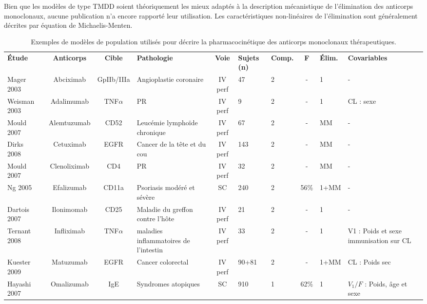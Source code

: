 Bien que les modèles de type TMDD soient théoriquement les mieux adaptés à la description mécanistique de l'élimination des anticorps monoclonaux, aucune publication n'a encore rapporté leur utilisation. Les caractéristiques non-linéaires de l'élimination sont généralement décrites par équation de Michaelis-Menten.  

\begin{table}[!ht]
\begin{tiny}
  \centering
  \caption{Exemples de modèles de population utilisés pour décrire la pharmacocinétique des anticorps monoclonaux thérapeutiques.}
    \begin{tabular}{p{1.1cm}ccp{1.7cm}cp{.9cm}p{.8cm}cp{.7cm}p{2.1cm}}
      &&&&&&&&& \\
      \hline
\textbf{Étude} & \textbf{Anticorps} & \textbf{Cible} & \textbf{Pathologie} & \textbf{Voie} & \textbf{Sujets (n)} & \textbf{Comp.} & \textbf{F} & \textbf{Élim.} & \textbf{Covariables} \\
      \hline
      \hline
      Mager 2003~\citep{REF65} & Abciximab & GpIIb/IIIa & Angioplastie coronaire & \gls{IV} perf & 47 & 2 & - & 1 & - \\
      Weisman 2003~\citep{REF66} & Adalimumab & TNF$\alpha$ & PR & \gls{IV} perf & 9 & 2 & - & 1 & \gls{CL} : sexe \\
      Mould 2007~\citep{REF67} & Alemtuzumab & CD52 & Leucémie lymphoïde chronique & \gls{IV} perf & 67 & 2 & - & MM & - \\
      Dirks 2008~\citep{REF68} & Cetuximab & EGFR & Cancer de la tête et du cou & \gls{IV} perf & 143 & 2 & - & MM & - \\
      Mould 2007~\citep{REF69} & Clenoliximab & CD4 & PR & \gls{IV} perf & 32 & 2 & - & MM & - \\
      Ng 2005~\citep{REF50} & Efalizumab & CD11a & Psoriasis modéré et sévère & SC & 240 & 2 & 56\% & 1+MM & - \\
      Dartois 2007~\citep{REF70} & Ilonimomab & CD25 & Maladie du greffon contre l'hôte & \gls{IV} perf & 21 & 2 & - & 1 & - \\
      Ternant 2008~\citep{REF71} & Infliximab & TNF$\alpha$ & maladies inflammatoires de l'intestin & \gls{IV} perf & 33 & 2 & - & 1 & V1 : Poids et sexe immunisation sur \gls{CL} \\
      Kuester 2009~\citep{REF72} & Matuzumab & EGFR & Cancer colorectal & \gls{IV} perf & 90+81 & 2 & - & 1+MM & \gls{CL} : Poids sec \\
      Hayashi 2007~\citep{REF61} & Omalizumab & IgE & Syndromes atopiques & SC & 910 & 1 & 62\% & 1 & $V_1/F$ : Poids,  âge et sexe \\

\end{tabular}
\end{tiny}
\end{table}
